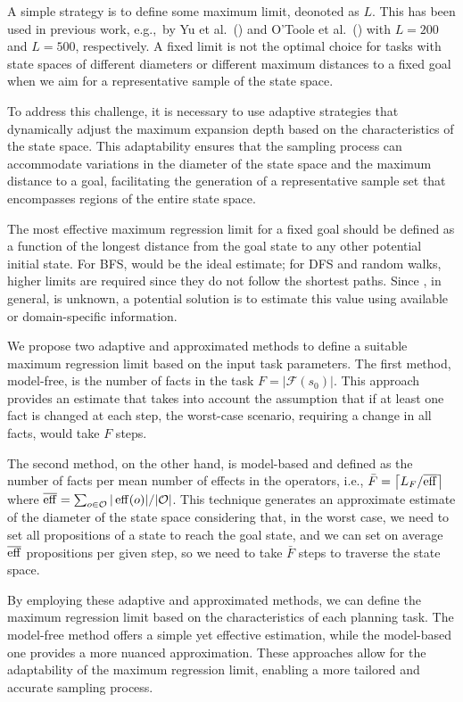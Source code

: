 A simple strategy is to define some maximum limit, deonoted as $L$. This has been used in previous work, e.g.,~by Yu et al.~(\citeyear{Yu.etal/2020}) and O'Toole et al.~(\citeyear{OToole/2022}) with $L=200$ and $L=500$, respectively. A fixed limit is not the optimal choice for tasks with state spaces of different diameters or different maximum distances to a fixed goal when we aim for a representative sample of the state space.

To address this challenge, it is necessary to use adaptive strategies that dynamically adjust the maximum expansion depth based on the characteristics of the state space. This adaptability ensures that the sampling process can accommodate variations in the diameter of the state space and the maximum distance to a goal, facilitating the generation of a representative sample set that encompasses regions of the entire state space.

The most effective maximum regression limit for a fixed goal should be defined as a function of the longest distance \distfarthest from the goal state to any other potential initial state. For BFS, \distfarthest would be the ideal estimate; for DFS and random walks, higher limits are required since they do not follow the shortest paths.
Since \distfarthest, in general, is unknown, a potential solution is to estimate this value using available or domain-specific information.

We propose two adaptive and approximated methods to define a suitable maximum regression limit based on the input task parameters. The first method, model-free, is the number of facts in the task $F=|\mathcal{F}(s_0)|$. This approach provides an estimate that takes into account the assumption that if at least one fact is changed at each step, the worst-case scenario, requiring a change in all facts, would take $F$ steps.

The second method, on the other hand, is model-based and defined as the number of facts per mean number of effects in the operators, i.e., $\bar F=\left\lceil L_F/\overline{\operatorname{eff}}\right\rceil$ where $\overline{\operatorname{eff}}=\sum_{o\in \mathcal{O}} |\operatorname{eff}(o)|/|\mathcal{O}|$. This technique generates an approximate estimate of the diameter of the state space considering that, in the worst case, we need to set all propositions of a state to reach the goal state, and we can set on average $\overline{\operatorname{eff}}$ propositions per given step, so we need to take $\bar F$ steps to traverse the state space.

By employing these adaptive and approximated methods, we can define the maximum regression limit based on the characteristics of each planning task. The model-free method offers a simple yet effective estimation, while the model-based one provides a more nuanced approximation. These approaches allow for the adaptability of the maximum regression limit, enabling a more tailored and accurate sampling process.

